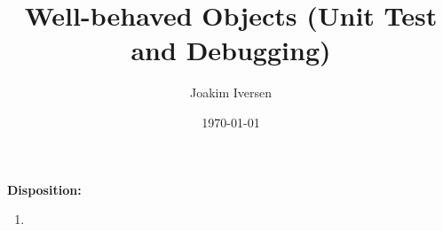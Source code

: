\documentclass{article}
\title{Well-behaved Objects (Unit Test and Debugging)}
\author{Joakim Iversen}
\date{\today}
\begin{document}
\maketitle
\newpage

\textbf{\Large Disposition:}
\begin{enumerate}
    \item 
\end{enumerate}
\end{document}
